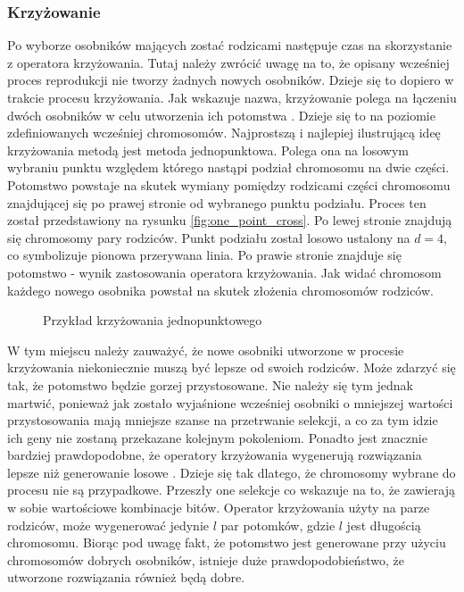 \documentclass[twoside]{iisthesis}
\begin{document}
\subsubsection{Krzyżowanie}
Po wyborze osobników mających zostać rodzicami następuje czas na skorzystanie z operatora krzyżowania. Tutaj należy zwrócić uwagę na to, że opisany wcześniej proces reprodukcji nie tworzy żadnych nowych osobników. Dzieje się to dopiero w trakcie procesu krzyżowania. Jak wskazuje nazwa, krzyżowanie polega na łączeniu dwóch osobników w celu utworzenia ich potomstwa \cite{ga_book}. Dzieje się to na poziomie zdefiniowanych wcześniej chromosomów. Najprostszą i najlepiej ilustrującą ideę krzyżowania metodą jest metoda jednopunktowa. Polega ona na losowym wybraniu punktu względem którego nastąpi podział chromosomu na dwie części. Potomstwo powstaje na skutek wymiany pomiędzy rodzicami części chromosomu znajdującej się po prawej stronie od wybranego punktu podziału. Proces ten został przedstawiony na rysunku \eqref{fig:one_point_cross}. Po lewej stronie znajdują się chromosomy pary rodziców. Punkt podziału został losowo ustalony na $d=4$, co symbolizuje pionowa przerywana linia. Po prawie stronie znajduje się potomstwo - wynik zastosowania operatora krzyżowania. Jak widać chromosom każdego nowego osobnika powstał na skutek złożenia chromosomów rodziców.
\begin{figure}[!htb]
	\centering
	\caption{Przykład krzyżowania jednopunktowego}
	\label{fig:one_point_cross}
\end{figure}

W tym miejscu należy zauważyć, że nowe osobniki utworzone w procesie krzyżowania niekoniecznie muszą być lepsze od swoich rodziców. Może zdarzyć się tak, że potomstwo będzie gorzej przystosowane. Nie należy się tym jednak martwić, ponieważ jak zostało wyjaśnione wcześniej osobniki o mniejszej wartości przystosowania mają mniejsze szanse na przetrwanie selekcji, a co za tym idzie ich geny nie zostaną przekazane kolejnym pokoleniom. Ponadto jest znacznie bardziej prawdopodobne, że operatory krzyżowania wygenerują rozwiązania lepsze niż generowanie losowe \cite{book}. Dzieje się tak dlatego, że chromosomy wybrane do procesu nie są przypadkowe. Przeszły one selekcje co wskazuje na to, że zawierają w sobie wartościowe kombinacje bitów. Operator krzyżowania użyty na parze rodziców, może wygenerować jedynie $l$ par potomków, gdzie $l$ jest długością chromosomu. Biorąc pod uwagę fakt, że potomstwo jest generowane przy użyciu chromosomów dobrych osobników, istnieje duże prawdopodobieństwo, że utworzone rozwiązania również będą dobre.
\end{document}
